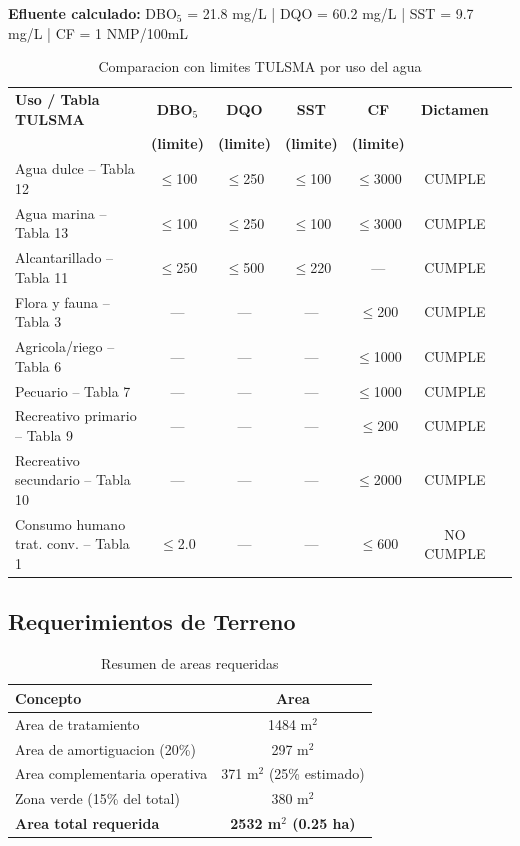 \documentclass[12pt,a4paper]{article}
\begin{document}
\textbf{Efluente calculado:} DBO$_5$ = 21.8 mg/L | DQO = 60.2 mg/L | SST = 9.7 mg/L | CF = 1 NMP/100mL

\vspace{0.5em}
\begin{table}[H]
\centering
\small
\caption{Comparacion con limites TULSMA por uso del agua}
\begin{tabular}{lcccccc}
\toprule
\textbf{Uso / Tabla TULSMA} & \textbf{DBO$_5$} & \textbf{DQO} & \textbf{SST} & \textbf{CF} & \textbf{Dictamen} \\
& \textbf{(limite)} & \textbf{(limite)} & \textbf{(limite)} & \textbf{(limite)} & \\
\midrule
Agua dulce -- Tabla 12 & $\leq$100 & $\leq$250 & $\leq$100 & $\leq$3000 & CUMPLE \\
Agua marina -- Tabla 13 & $\leq$100 & $\leq$250 & $\leq$100 & $\leq$3000 & CUMPLE \\
Alcantarillado -- Tabla 11 & $\leq$250 & $\leq$500 & $\leq$220 & --- & CUMPLE \\
Flora y fauna -- Tabla 3 & --- & --- & --- & $\leq$200 & CUMPLE \\
Agricola/riego -- Tabla 6 & --- & --- & --- & $\leq$1000 & CUMPLE \\
Pecuario -- Tabla 7 & --- & --- & --- & $\leq$1000 & CUMPLE \\
Recreativo primario -- Tabla 9 & --- & --- & --- & $\leq$200 & CUMPLE \\
Recreativo secundario -- Tabla 10 & --- & --- & --- & $\leq$2000 & CUMPLE \\
Consumo humano trat. conv. -- Tabla 1 & $\leq$2.0 & --- & --- & $\leq$600 & NO CUMPLE \\
\bottomrule
\end{tabular}
\end{table}

\subsection{Requerimientos de Terreno}

\begin{table}[H]
\centering
\caption{Resumen de areas requeridas}
\begin{tabular}{lc}
\toprule
\textbf{Concepto} & \textbf{Area} \\
\midrule
Area de tratamiento & 1484 m$^2$ \\
Area de amortiguacion (20\%) & 297 m$^2$ \\
Area complementaria operativa & 371 m$^2$ (25\% estimado) \\
Zona verde (15\% del total) & 380 m$^2$ \\
\midrule
\textbf{Area total requerida} & \textbf{2532 m$^2$ (0.25 ha)} \\
\bottomrule
\end{tabular}
\end{table}
\end{document}
